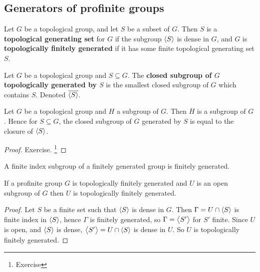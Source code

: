 \pagebreak

\subsection{Generators of profinite groups}

\begin{definition}
Let $ G $ be a topological group, and let $ S $ be a subset of $ G $. Then $ S $ is a \textbf{topological generating set} for $ G $ if the subgroup $ \left\langle S \right\rangle $ is dense in $ G $, and $ G $ is \textbf{topologically finitely generated} if it has some finite topological generating set $ S $.
\end{definition}

\begin{definition}
Let $ G $ be a topological group and $ S \subseteq G $. The \textbf{closed subgroup of $ G $ topologically generated by $ S $} is the smallest closed subgroup of $ G $ which contains $ S $. Denoted $ \overline{\left\langle S \right\rangle} $.
\end{definition}

\begin{proposition}
Let $ G $ be a topological group and $ H $ a subgroup of $ G $. Then $ \overline{H} $ is a subgroup of $ G $. Hence for $ S \subseteq G $, the closed subgroup of $ G $ generated by $ S $ is equal to the closure of $ \left\langle S \right\rangle $.
\end{proposition}

\begin{proof}
Exercise. \footnote{Exercise}
\end{proof}

\begin{lemma}
A finite index subgroup of a finitely generated group is finitely generated.
\end{lemma}

\begin{proposition}
If a profinite group $ G $ is topologically finitely generated and $ U $ is an open subgroup of $ G $ then $ U $ is topologically finitely generated.
\end{proposition}

\begin{proof}
Let $ S $ be a finite set such that $ \left\langle S \right\rangle $ is dense in $ G $. Then $ \Gamma = U \cap \left\langle S \right\rangle $ is finite index in $ \left\langle S \right\rangle $, hence $ \Gamma $ is finitely generated, so $ \Gamma = \left\langle S' \right\rangle $ for $ S' $ finite. Since $ U $ is open, and $ \left\langle S \right\rangle $ is dense, $ \left\langle S' \right\rangle = U \cap \left\langle S \right\rangle $ is dense in $ U $. So $ U $ is topologically finitely generated.
\end{proof}

